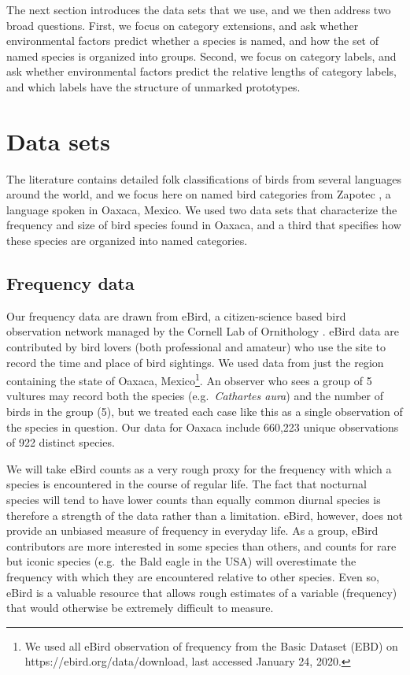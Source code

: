 \documentclass[10pt,letterpaper]{article}
\begin{document}
The next section introduces the data sets that we use, and we then address two broad questions. First, we focus on category extensions, and ask whether environmental factors predict whether a species is named, and how the set of named species is organized into groups. Second, we focus on category labels, and ask whether environmental factors predict the relative lengths of category labels, and which labels have the structure of unmarked prototypes. 


\section{Data sets}

The literature contains detailed folk classifications of birds from several languages around the world, and we focus here on named bird categories from Zapotec \cite{hunn2008zapotec}, a language spoken in Oaxaca, Mexico.  We used two data sets that characterize the frequency and size of bird species found in Oaxaca, and a third that specifies how these species are organized into named categories.

\subsection{Frequency data}

Our frequency data are drawn from eBird, a citizen-science based bird observation network managed by the Cornell Lab of Ornithology \cite{sullivan2009ebird}.  eBird data are contributed by bird lovers (both professional and amateur) who use the site to record the time and place of bird sightings.  We used data from just the region containing the state of Oaxaca, Mexico\footnote{We used all eBird observation of frequency from the Basic Dataset (EBD) on https://ebird.org/data/download, last accessed January 24, 2020.}. An observer who sees a group of 5 vultures may record both the species (e.g.\ \emph{Cathartes aura}) and the number of birds in the group (5), but we treated each case like this as a single observation of the species in question. Our data for Oaxaca include 660,223 unique observations of 922 distinct species. 

We will take eBird counts as a very rough proxy for the frequency with which a species is encountered in the course of regular life. The fact that nocturnal species will tend to have lower counts than equally common diurnal species is therefore a strength of the data rather than a limitation. eBird, however,  does not provide an unbiased measure of frequency in everyday life. As a group, eBird contributors are more interested in some species than others, and counts for rare but iconic species (e.g.\ the Bald eagle in the USA) will overestimate the frequency with which they are encountered relative to other species. Even so, eBird is a valuable resource that allows rough estimates of a variable (frequency) that would otherwise be extremely difficult to measure.  
\end{document}
